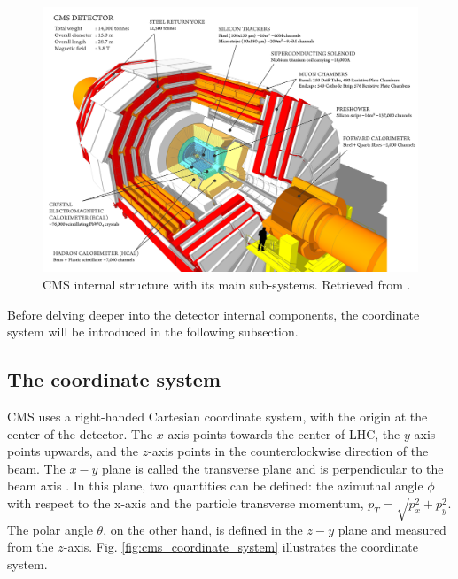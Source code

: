 \begin{figure}[htp!]
	\centering
	\includegraphics[scale=0.2]{MainContent/Figs/cms_structure.png}
	\caption{CMS internal structure with its main sub-systems. Retrieved from \cite{sanchez2020search}.}
	\label{fig:CMS_structure}
\end{figure}


Before delving deeper into the detector internal components, the coordinate system will be introduced in the following subsection.

\subsection{The coordinate system}
CMS uses a right-handed Cartesian coordinate system, with the origin at the center of the detector. The $x$-axis points towards the center of LHC, the $y$-axis points upwards, and the $z$-axis points in the counterclockwise direction of the beam. The $x-y$ plane is called the transverse plane and is perpendicular to the beam axis \cite{baron2018desarrollo, sanchez2020search, lechner2021measurement}. In this plane, two quantities can be defined: the azimuthal angle $\phi$ with respect to the x-axis and the particle transverse momentum, $p_T = \sqrt{p_x^2 + p_y^2}$. The polar angle $\theta$, on the other hand, is defined in the $z-y$ plane and measured from the $z$-axis. Fig. \ref{fig:cms_coordinate_system} illustrates the coordinate system.


